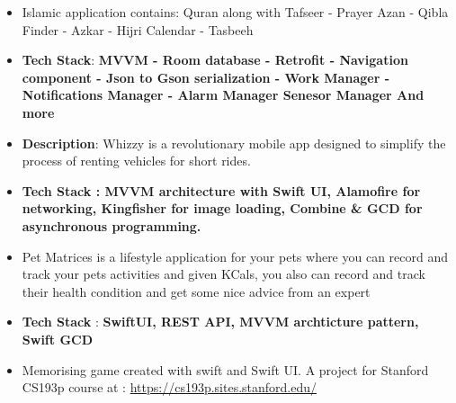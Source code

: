 \documentclass[10pt,a4paper,ragged2e,withhyper]{altacv}
\begin{document}
\begin{itemize}
\item \textbf{}Islamic application contains:
Quran along with Tafseer - Prayer Azan - Qibla Finder - Azkar - Hijri Calendar - Tasbeeh
\item \textbf{Tech Stack}: \textbf{MVVM - Room database - Retrofit - Navigation component - Json to Gson serialization - Work Manager - Notifications Manager - Alarm Manager Senesor Manager And more}
\end{itemize}
\divider



\vspace{6px}
\vspace{2px}


\hypertarget{whizzy}{}
\begin{itemize}
\item \textbf{Description}: Whizzy is a revolutionary mobile app designed to simplify the process of renting vehicles for short rides.
\item \textbf{Tech Stack : MVVM architecture with Swift UI, Alamofire for networking, Kingfisher for image loading, Combine & GCD for asynchronous programming.}
\end{itemize}
\divider



\hypertarget{pet_materices}{}
\begin{itemize}
\item \textbf{}Pet Matrices is a lifestyle application for your pets where you can record and track your pets activities and given KCals, you also can record and track their health condition and get some nice advice from an expert
\item \textbf{Tech Stack} : \textbf{SwiftUI, REST API, MVVM archticture pattern, Swift GCD}
\end{itemize}
\divider

\begin{itemize}
\item \textbf{} Memorising game created with swift and Swift UI. \linebreak
A project for Stanford CS193p course at : \href{https://cs193p.sites.stanford.edu/}{https://cs193p.sites.stanford.edu/}
\end{itemize}
\divider
\end{document}
